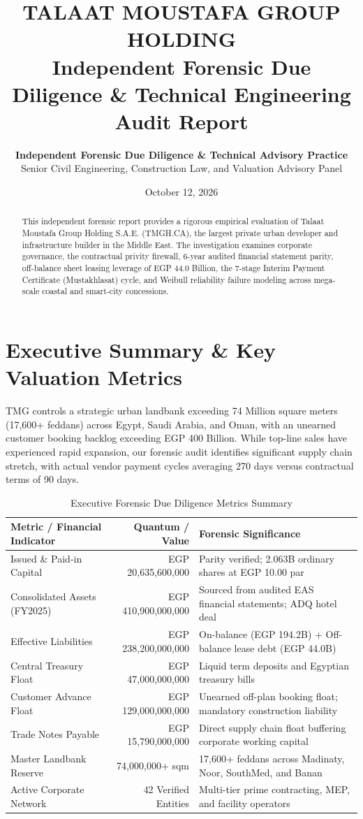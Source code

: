 \documentclass[10pt,a4paper]{article}
\title{\Huge\bfseries\color{tmgblue} TALAAT MOUSTAFA GROUP HOLDING \\ \Large Independent Forensic Due Diligence \& Technical Engineering Audit Report}
\author{\textbf{Independent Forensic Due Diligence \& Technical Advisory Practice} \\ Senior Civil Engineering, Construction Law, and Valuation Advisory Panel}
\date{October 12, 2026}
\begin{document}
\maketitle

\begin{abstract}
This independent forensic report provides a rigorous empirical evaluation of Talaat Moustafa Group Holding S.A.E. (TMGH.CA), the largest private urban developer and infrastructure builder in the Middle East. The investigation examines corporate governance, the contractual privity firewall, 6-year audited financial statement parity, off-balance sheet leasing leverage of EGP 44.0 Billion, the 7-stage Interim Payment Certificate (Mustakhlasat) cycle, and Weibull reliability failure modeling across mega-scale coastal and smart-city concessions.
\end{abstract}

\section{Executive Summary \& Key Valuation Metrics}
TMG controls a strategic urban landbank exceeding 74 Million square meters (17,600+ feddans) across Egypt, Saudi Arabia, and Oman, with an unearned customer booking backlog exceeding EGP 400 Billion. While top-line sales have experienced rapid expansion, our forensic audit identifies significant supply chain stretch, with actual vendor payment cycles averaging 270 days versus contractual terms of 90 days.

\begin{table}[h]
\centering
\small
\begin{tabularx}{\textwidth}{l r X}
\toprule
\textbf{Metric / Financial Indicator} & \textbf{Quantum / Value} & \textbf{Forensic Significance} \\
\midrule
Issued \& Paid-in Capital & EGP 20,635,600,000 & Parity verified; 2.063B ordinary shares at EGP 10.00 par \\
Consolidated Assets (FY2025) & EGP 410,900,000,000 & Sourced from audited EAS financial statements; ADQ hotel deal \\
Effective Liabilities & EGP 238,200,000,000 & On-balance (EGP 194.2B) + Off-balance lease debt (EGP 44.0B) \\
Central Treasury Float & EGP 47,000,000,000 & Liquid term deposits and Egyptian treasury bills \\
Customer Advance Float & EGP 129,000,000,000 & Unearned off-plan booking float; mandatory construction liability \\
Trade Notes Payable & EGP 15,790,000,000 & Direct supply chain float buffering corporate working capital \\
Master Landbank Reserve & 74,000,000+ sqm & 17,600+ feddans across Madinaty, Noor, SouthMed, and Banan \\
Active Corporate Network & 42 Verified Entities & Multi-tier prime contracting, MEP, and facility operators \\
\bottomrule
\end{tabularx}
\caption{Executive Forensic Due Diligence Metrics Summary}
\end{table}
\end{document}
